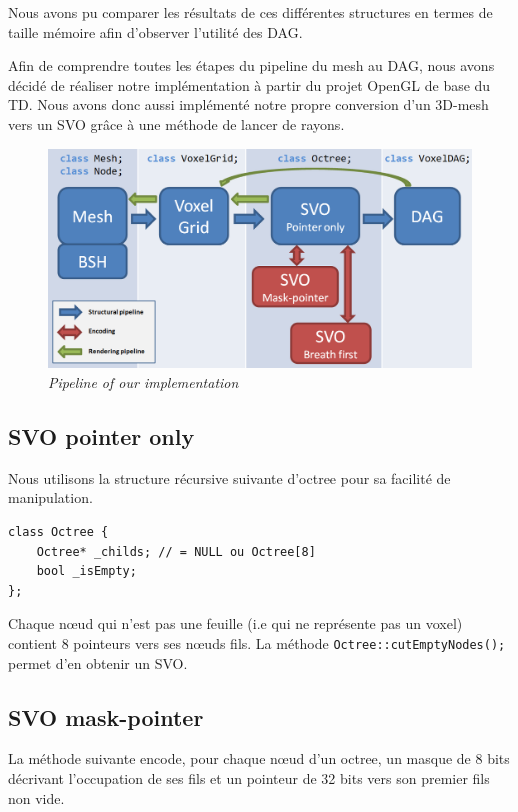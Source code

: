 \documentclass[a4paper]{article}
\begin{document}
Nous avons pu comparer les résultats de ces différentes structures en termes de taille mémoire afin d'observer l'utilité des DAG.


Afin de comprendre toutes les étapes du pipeline du mesh au DAG, nous avons décidé de réaliser notre implémentation à partir du projet OpenGL de base du TD. Nous avons donc aussi implémenté notre propre conversion d’un 3D-mesh vers un SVO grâce à une méthode de lancer de rayons.

\begin{figure}
\centering
\includegraphics[width=1\textwidth]{ClassGraph.png}
\caption{\label{fig:triceratops}\textit{Pipeline of our implementation}}
\end{figure}

\subsection{SVO pointer only}

Nous utilisons la structure récursive suivante d’octree pour sa facilité de manipulation.

\begin{lstlisting}
class Octree {
	Octree* _childs; // = NULL ou Octree[8]
	bool _isEmpty;
};
\end{lstlisting}

Chaque nœud qui n’est pas une feuille (i.e qui ne représente pas un voxel) contient 8 pointeurs vers ses nœuds fils. La méthode \texttt{Octree::cutEmptyNodes();} permet d’en obtenir un SVO. 

\subsection{SVO mask-pointer}

La méthode suivante encode, pour chaque nœud d'un octree, un masque de 8 bits décrivant l’occupation de ses fils et un pointeur de 32 bits vers son premier fils non vide. 
\end{document}

